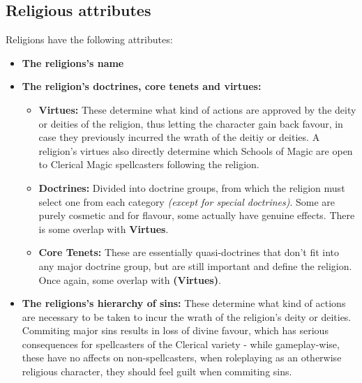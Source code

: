 \subsection{Religious attributes}
Religions have the following attributes:
\begin{itemize}
\item \textbf{The religions's name}
\item \textbf{The religion's doctrines, core tenets and virtues:} %
    \begin{itemize}
        \item \textbf{Virtues:} These determine what kind of actions are approved by the deity or deities of the religion, thus letting the character gain back favour, in case they previously incurred the wrath of the deitiy or deities. A religion's virtues also directly determine which Schools of Magic are open to Clerical Magic spellcasters following the religion.
        \item \textbf{Doctrines:} Divided into doctrine groups, from which the religion must select one from each category \textit{(except for special doctrines)}. Some are purely cosmetic and for flavour, some actually have genuine effects. There is some overlap with \textbf{Virtues}.
        \item \textbf{Core Tenets:} These are essentially quasi-doctrines that don't fit into any major doctrine group, but are still important and define the religion. Once again, some overlap with \textbf{(Virtues)}.
    \end{itemize}
\item \textbf{The religions's hierarchy of sins:} These determine what kind of actions are necessary to be taken to incur the wrath of the religion's deity or deities. Commiting major sins results in loss of divine favour, which has serious consequences for spellcasters of the Clerical variety - while gameplay-wise, these have no affects on non-spellcasters, when roleplaying as an otherwise religious character, they should feel guilt when commiting sins.
\end{itemize}
